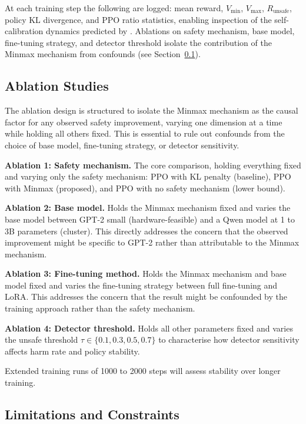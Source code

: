 \documentclass[a4paper,twoside,12pt]{report}
\newcommand{\runsafe}{R_{\text{unsafe}}}
\newcommand{\vmin}{V_{\min}}
\newcommand{\vmax}{V_{\max}}
\begin{document}
At each training step the following are logged: mean reward, $\vmin$, $\vmax$,
$\runsafe$, policy KL divergence, and PPO ratio statistics, enabling inspection of the
self-calibration dynamics predicted by \citet{nanguetasse2026}. Ablations on safety
mechanism, base model, fine-tuning strategy, and detector threshold isolate the
contribution of the Minmax mechanism from confounds (see Section~\ref{sec:ablations}).

\subsection{Ablation Studies}
\label{sec:ablations}

The ablation design is structured to isolate the Minmax mechanism as the causal factor for
any observed safety improvement, varying one dimension at a time while holding all others
fixed. This is essential to rule out confounds from the choice of base model, fine-tuning
strategy, or detector sensitivity.

\textbf{Ablation 1: Safety mechanism.} The core comparison, holding everything fixed and
varying only the safety mechanism: PPO with KL penalty (baseline), PPO with Minmax
(proposed), and PPO with no safety mechanism (lower bound).

\textbf{Ablation 2: Base model.} Holds the Minmax mechanism fixed and varies the base
model between GPT-2 small (hardware-feasible) and a Qwen model at 1 to 3B parameters
(cluster). This directly addresses the concern that the observed improvement might be
specific to GPT-2 rather than attributable to the Minmax mechanism.

\textbf{Ablation 3: Fine-tuning method.} Holds the Minmax mechanism and base model fixed
and varies the fine-tuning strategy between full fine-tuning and LoRA. This addresses the
concern that the result might be confounded by the training approach rather than the safety
mechanism.

\textbf{Ablation 4: Detector threshold.} Holds all other parameters fixed and varies the
unsafe threshold $\tau \in \{0.1, 0.3, 0.5, 0.7\}$ to characterise how detector sensitivity
affects harm rate and policy stability.

Extended training runs of 1000 to 2000 steps will assess stability over longer training.

\subsection{Limitations and Constraints}
\label{sec:limitations}
\end{document}
